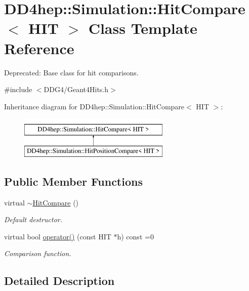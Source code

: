 \hypertarget{class_d_d4hep_1_1_simulation_1_1_hit_compare}{}\section{D\+D4hep\+:\+:Simulation\+:\+:Hit\+Compare$<$ H\+IT $>$ Class Template Reference}
\label{class_d_d4hep_1_1_simulation_1_1_hit_compare}


Deprecated\+: Base class for hit comparisons.  




{\ttfamily \#include $<$D\+D\+G4/\+Geant4\+Hits.\+h$>$}

Inheritance diagram for D\+D4hep\+:\+:Simulation\+:\+:Hit\+Compare$<$ H\+IT $>$\+:\begin{figure}[H]
\begin{center}
\leavevmode
\includegraphics[height=2.000000cm]{class_d_d4hep_1_1_simulation_1_1_hit_compare}
\end{center}
\end{figure}
\subsection*{Public Member Functions}
\begin{DoxyCompactItemize}
\item 
virtual \hyperlink{class_d_d4hep_1_1_simulation_1_1_hit_compare_a33e13448c6cda44f7d56a13e414635b3}{$\sim$\+Hit\+Compare} ()
\begin{DoxyCompactList}\small\item\em Default destructor. \end{DoxyCompactList}\item 
virtual bool \hyperlink{class_d_d4hep_1_1_simulation_1_1_hit_compare_a025eaffc34d0aad36988120c7d158ec7}{operator()} (const H\+IT $\ast$h) const =0
\begin{DoxyCompactList}\small\item\em Comparison function. \end{DoxyCompactList}\end{DoxyCompactItemize}


\subsection{Detailed Description}
